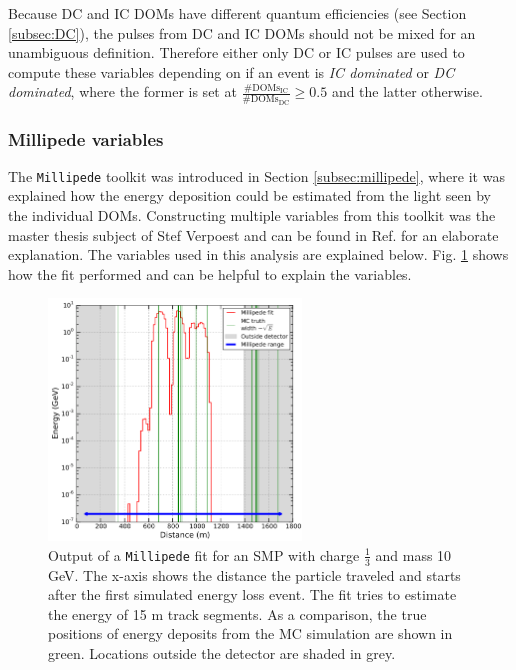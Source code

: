 Because DC and IC DOMs have different quantum efficiencies (see Section \ref{subsec:DC}), the pulses from DC and IC DOMs should not be mixed for an unambiguous definition. Therefore either only DC or IC pulses are used to compute these variables depending on if an event is \textit{IC dominated} or \textit{DC dominated}, where the former is set at $\frac{\# \textrm{DOMs}_\textrm{IC}}{\# \textrm{DOMs}_\textrm{DC}} \geq 0.5$ and the latter otherwise.

\subsubsection{Millipede variables}
The \texttt{Millipede} toolkit was introduced in Section \ref{subsec:millipede}, where it was explained how the energy deposition could be estimated from the light seen by the individual DOMs. Constructing multiple variables from this toolkit was the master thesis subject of Stef Verpoest and can be found in Ref. \cite{steffthesis} for an elaborate explanation. The variables used in this analysis are explained below. Fig. \ref{fig:millipedeoutput} shows how the fit performed and can be helpful to explain the variables.

\begin{figure}[ht]
\centering
\includegraphics[width=0.6\textwidth]{chapter8/img/millipedeStef.png}
\caption{Output of a \texttt{Millipede} fit for an SMP with charge $\frac{1}{3}$ and mass 10 GeV. The x-axis shows the distance the particle traveled and starts after the first simulated energy loss event. The fit tries to estimate the energy of 15 m track segments. As a comparison, the true positions of energy deposits from the MC simulation are shown in green. Locations outside the detector are shaded in grey.}
\label{fig:millipedeoutput}
\end{figure}

